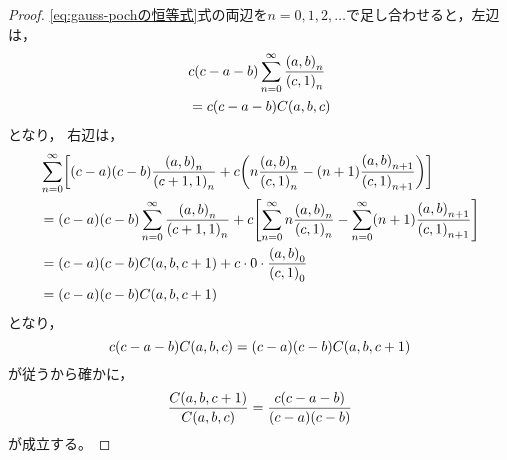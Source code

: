 \documentclass[a4paper,draft]{ltjsarticle}
\begin{document}
\begin{thm}[Kummerの関係]
\begin{proof}
        \eqref{eq:gauss-pochの恒等式}式の両辺を$n=0,1,2,\dots$で足し合わせると，左辺は，
        \begin{align}
            &c\pare{c-a-b}\sum_{n=0}^\infty \frac{\poch{a,b}{n}}{\poch{c,1}{n}}
            \\
            &=c\pare{c-a-b}\fun{C}{a,b,c}
        \end{align}
        となり，
        右辺は，
        \begin{align}
            &\sum_{n=0}^\infty \squ{\pare{c-a}\pare{c-b}\frac{\poch{a,b}{n}}{\poch{c+1,1}{n}}
            +c\pare{
                n\frac{\poch{a,b}{n}}{\poch{c,1}{n}}
                -\pare{n+1}\frac{\poch{a,b}{n+1}}{\poch{c,1}{n+1}}
            }}
            \\
            &=\pare{c-a}\pare{c-b}\sum_{n=0}^\infty \frac{\poch{a,b}{n}}{\poch{c+1,1}{n}}+c\squ{
                \sum_{n=0}^\infty n\frac{\poch{a,b}{n}}{\poch{c,1}{n}}
                -\sum_{n=0}^\infty\pare{n+1}\frac{\poch{a,b}{n+1}}{\poch{c,1}{n+1}}
            }
            \\
            &=\pare{c-a}\pare{c-b}\fun{C}{a,b,c+1}+c\cdot 0\cdot \frac{\poch{a,b}{0}}{\poch{c,1}{0}}
            \\
            &=\pare{c-a}\pare{c-b}\fun{C}{a,b,c+1}
        \end{align}
        となり，
        \begin{equation}
            c\pare{c-a-b}\fun{C}{a,b,c}=\pare{c-a}\pare{c-b}\fun{C}{a,b,c+1}
        \end{equation}
        が従うから確かに，
        \begin{equation}
            \frac{\fun{C}{a,b,c+1}}{\fun{C}{a,b,c}}=\frac{c\pare{c-a-b}}{\pare{c-a}\pare{c-b}}
        \end{equation}
        が成立する。


\end{proof}
\end{thm}
\end{document}
